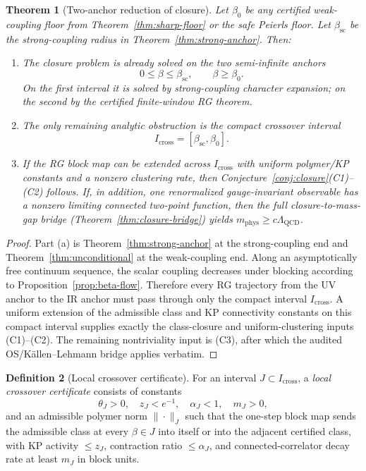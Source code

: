 \documentclass[11pt]{article}
\newtheorem{theorem}{Theorem}[section]
\theoremstyle{definition}
\newtheorem{definition}[theorem]{Definition}
\newcommand{\Lam}{\Lambda_{\mathrm{QCD}}}
\newcommand{\betasc}{\beta_{\mathrm{sc}}}
\begin{document}
\begin{theorem}[Two-anchor reduction of closure]
\label{thm:two-anchor-reduction}
Let $\beta_0$ be any certified weak-coupling floor from
Theorem~\ref{thm:sharp-floor} or the safe Peierls floor.  Let $\betasc$
be the strong-coupling radius in Theorem~\ref{thm:strong-anchor}.  Then:
\begin{enumerate}[label=\textup{(\alph*)},nosep]
\item The closure problem is already solved on the two semi-infinite
anchors
\[
0\le\beta\le\betasc,
\qquad
\beta\ge\beta_0.
\]
On the first interval it is solved by strong-coupling character
expansion; on the second by the certified finite-window RG theorem.
\item The only remaining analytic obstruction is the compact crossover
interval
\[
I_{\mathrm{cross}}=[\betasc,\beta_0].
\]
\item If the RG block map can be extended across $I_{\mathrm{cross}}$
with uniform polymer/KP constants and a nonzero clustering rate, then
Conjecture~\ref{conj:closure}(C1)--(C2) follows.  If, in addition,
one renormalized gauge-invariant observable has a nonzero limiting
connected two-point function, then the full closure-to-mass-gap bridge
(Theorem~\ref{thm:closure-bridge}) yields
$m_{\mathrm{phys}}\ge c\Lam$.
\end{enumerate}
\end{theorem}

\begin{proof}
Part (a) is Theorem~\ref{thm:strong-anchor} at the strong-coupling end
and Theorem~\ref{thm:unconditional} at the weak-coupling end.  Along an
asymptotically free continuum sequence, the scalar coupling decreases
under blocking according to Proposition~\ref{prop:beta-flow}.  Therefore
every RG trajectory from the UV anchor to the IR anchor must pass through
only the compact interval $I_{\mathrm{cross}}$.  A uniform extension of
the admissible class and KP connectivity constants on this compact
interval supplies exactly the class-closure and uniform-clustering inputs
(C1)--(C2).  The remaining nontriviality input is (C3), after which the
audited OS/K\"allen--Lehmann bridge applies verbatim.
\end{proof}

\begin{definition}[Local crossover certificate]
\label{def:local-crossover-cert}
For an interval $J\subset I_{\mathrm{cross}}$, a \emph{local crossover
certificate} consists of constants
\[
\theta_J>0,
\quad z_J<e^{-1},
\quad \alpha_J<1,
\quad m_J>0,
\]
and an admissible polymer norm $\|\cdot\|_J$ such that the one-step block
map sends the admissible class at every $\beta\in J$ into itself or into
the adjacent certified class, with KP activity $\le z_J$, contraction
ratio $\le\alpha_J$, and connected-correlator decay rate at least $m_J$
in block units.
\end{definition}
\end{document}
